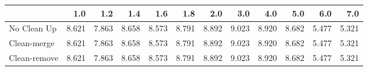 \begin{tabular}{lrrrrrrrrrrr}
\toprule
{} &   1.0 &   1.2 &   1.4 &   1.6 &   1.8 &   2.0 &   3.0 &   4.0 &   5.0 &   6.0 &   7.0 \\
\midrule
No Clean Up  & 8.621 & 7.863 & 8.658 & 8.573 & 8.791 & 8.892 & 9.023 & 8.920 & 8.682 & 5.477 & 5.321 \\
Clean-merge  & 8.621 & 7.863 & 8.658 & 8.573 & 8.791 & 8.892 & 9.023 & 8.920 & 8.682 & 5.477 & 5.321 \\
Clean-remove & 8.621 & 7.863 & 8.658 & 8.573 & 8.791 & 8.892 & 9.023 & 8.920 & 8.682 & 5.477 & 5.321 \\
\bottomrule
\end{tabular}
